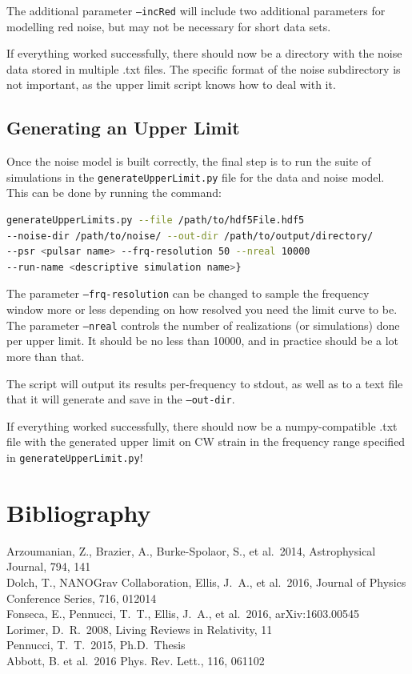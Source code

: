 \documentclass[12pt]{article}
\begin{document}
The additional parameter \texttt{--incRed} will include two additional parameters for
modelling red noise, but may not be necessary for short data sets.

If everything worked successfully, there should now be a directory with the
noise data stored in multiple .txt files. The specific format of the noise
subdirectory is not important, as the upper limit script knows how to deal with
it.

\subsection*{Generating an Upper Limit}

Once the noise model is built correctly, the final step is to run the suite of
simulations in the \texttt{generateUpperLimit.py} file for the data and noise model. This
can be done by running the command:
\\
\begin{lstlisting}[language=bash]
generateUpperLimits.py --file /path/to/hdf5File.hdf5
--noise-dir /path/to/noise/ --out-dir /path/to/output/directory/
--psr <pulsar name> --frq-resolution 50 --nreal 10000
--run-name <descriptive simulation name>}
\end{lstlisting}

The parameter \texttt{--frq-resolution} can be changed to sample the frequency window
more or less depending on how resolved you need the limit curve to be. The
parameter \texttt{--nreal} controls the number of realizations (or simulations) done per
upper limit. It should be no less than 10000, and in practice should be a lot
more than that.

The script will output its results per-frequency to stdout, as well as to a text
file that it will generate and save in the \texttt{--out-dir}. 

If everything worked successfully, there should now be a numpy-compatible .txt
file with the generated upper limit on CW strain in the frequency range
specified in \texttt{generateUpperLimit.py}!

\newpage
\section*{Bibliography}
\noindent Arzoumanian, Z., Brazier, A., Burke-Spolaor, S., et al.\ 2014,
Astrophysical Journal, 794, 141
\\
\newline\noindent Dolch, T., NANOGrav Collaboration, Ellis, J.~A., et al.\ 2016,
Journal of Physics Conference Series, 716, 012014
\\
\newline\noindent Fonseca, E., Pennucci, T.~T., Ellis, J.~A., et al.\ 2016, arXiv:1603.00545 
\\
\newline\noindent Lorimer, D.~R.\ 2008, Living Reviews in Relativity, 11
\\
\newline\noindent Pennucci, T.~T.\ 2015, Ph.D.~Thesis
\\
\newline\noindent Abbott, B. et al.\ 2016 Phys. Rev. Lett., 116, 061102
\end{document}
